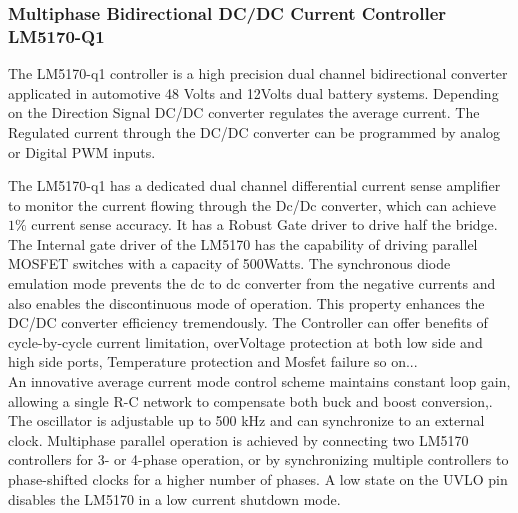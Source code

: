 \subsubsection{Multiphase Bidirectional DC/DC Current Controller LM5170-Q1}
\indent The LM5170-q1\cite{TI_LM5170_User_Datasheet} controller is a high precision dual channel bidirectional converter applicated in automotive 48 Volts and 12Volts dual battery systems.
Depending on the Direction Signal DC/DC converter regulates the average current. 
The Regulated current through the DC/DC converter can be programmed by analog or Digital PWM inputs.

The LM5170-q1\cite{TI_LM5170_User_Datasheet} has a dedicated dual channel differential current sense amplifier to monitor the current flowing through the Dc/Dc converter, which can achieve $1\%$ current sense accuracy.
It has a Robust Gate driver to drive half the bridge. The Internal gate driver of the LM5170 has the capability of driving parallel MOSFET switches with a capacity of 500Watts. 
The synchronous diode emulation mode prevents the dc to dc converter from the negative currents and also enables the discontinuous mode of operation. This property enhances the DC/DC converter efficiency tremendously. The Controller can offer benefits of cycle-by-cycle current limitation, overVoltage protection at both low side and high side ports, Temperature protection and Mosfet failure so on...
\\
\indent An innovative average current mode control scheme maintains constant loop gain, allowing a single R-C network
to compensate both buck and boost conversion\cite[p .2]{TI_LM5170_User_Datasheet},\cite{TI_LM5170_EVM_User_Guide}. The oscillator is adjustable up to 500 kHz and can synchronize
to an external clock. Multiphase parallel operation is achieved by connecting two LM5170 controllers for 3-
or 4-phase operation, or by synchronizing multiple controllers to phase-shifted clocks for a higher number of
phases. A low state on the UVLO pin disables the LM5170 in a low current shutdown mode\cite{TI_LM5170_User_Datasheet}.

